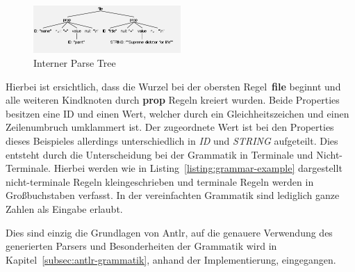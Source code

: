 \begin{figure}[h]
    \centering
    \includegraphics[width=0.5\textwidth]{images/2.2/parseTreeExample}
    \caption{Interner Parse Tree}
    \label{fig:parse-example}
\end{figure}

Hierbei ist ersichtlich, dass die Wurzel bei der obersten Regel~\textbf{file} beginnt und alle weiteren Kindknoten durch \textbf{prop} Regeln kreiert wurden.
Beide Properties besitzen eine ID und einen Wert, welcher durch ein Gleichheitszeichen und einen Zeilenumbruch umklammert ist.
Der zugeordnete Wert ist bei den Properties dieses Beispieles allerdings unterschiedlich in \textit{ID} und \textit{STRING} aufgeteilt.
Dies entsteht durch die Unterscheidung bei der Grammatik in Terminale und Nicht-Terminale.
Hierbei werden wie in Listing~\ref{listing:grammar-example} dargestellt nicht-terminale Regeln kleingeschrieben und terminale Regeln werden in Großbuchstaben verfasst.
In der vereinfachten Grammatik sind lediglich ganze Zahlen als Eingabe erlaubt.

Dies sind einzig die Grundlagen von \ac{Antlr}, auf die genauere Verwendung des generierten Parsers und Besonderheiten der Grammatik wird in Kapitel~\ref{subsec:antlr-grammatik},
anhand der Implementierung, eingegangen.

